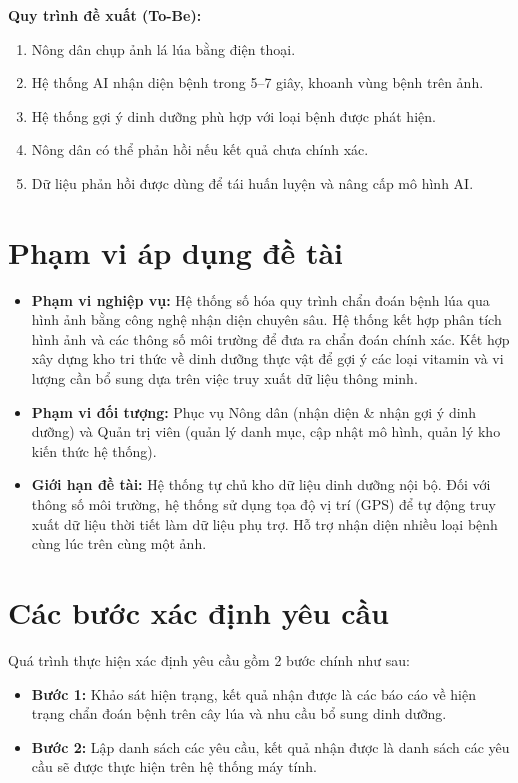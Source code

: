 \documentclass[12pt,a4paper]{article}
\begin{document}
\textbf{Quy trình đề xuất (To-Be):}
\begin{enumerate}
    \item Nông dân chụp ảnh lá lúa bằng điện thoại.
    \item Hệ thống AI nhận diện bệnh trong 5--7 giây, khoanh vùng bệnh trên ảnh.
    \item Hệ thống gợi ý dinh dưỡng phù hợp với loại bệnh được phát hiện.
    \item Nông dân có thể phản hồi nếu kết quả chưa chính xác.
    \item Dữ liệu phản hồi được dùng để tái huấn luyện và nâng cấp mô hình AI.
\end{enumerate}

\hrulefill

\section{Phạm vi áp dụng đề tài}
\begin{itemize}
    \item \textbf{Phạm vi nghiệp vụ:} Hệ thống số hóa quy trình chẩn đoán bệnh lúa qua hình ảnh bằng công nghệ nhận diện chuyên sâu. Hệ thống kết hợp phân tích hình ảnh và các thông số môi trường để đưa ra chẩn đoán chính xác. Kết hợp xây dựng kho tri thức về dinh dưỡng thực vật để gợi ý các loại vitamin và vi lượng cần bổ sung dựa trên việc truy xuất dữ liệu thông minh.
    \item \textbf{Phạm vi đối tượng:} Phục vụ Nông dân (nhận diện \& nhận gợi ý dinh dưỡng) và Quản trị viên (quản lý danh mục, cập nhật mô hình, quản lý kho kiến thức hệ thống).
    \item \textbf{Giới hạn đề tài:} Hệ thống tự chủ kho dữ liệu dinh dưỡng nội bộ. Đối với thông số môi trường, hệ thống sử dụng tọa độ vị trí (GPS) để tự động truy xuất dữ liệu thời tiết làm dữ liệu phụ trợ. Hỗ trợ nhận diện nhiều loại bệnh cùng lúc trên cùng một ảnh.
\end{itemize}

\section{Các bước xác định yêu cầu}

Quá trình thực hiện xác định yêu cầu gồm 2 bước chính như sau:
\begin{itemize}
    \item \textbf{Bước 1:} Khảo sát hiện trạng, kết quả nhận được là các báo cáo về hiện trạng chẩn đoán bệnh trên cây lúa và nhu cầu bổ sung dinh dưỡng.
    \item \textbf{Bước 2:} Lập danh sách các yêu cầu, kết quả nhận được là danh sách các yêu cầu sẽ được thực hiện trên hệ thống máy tính.
\end{itemize}
\end{document}
